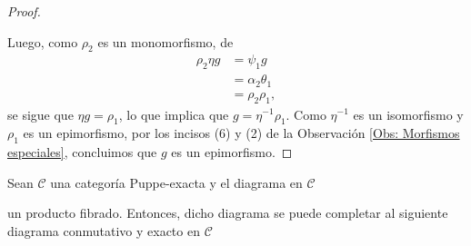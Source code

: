 \documentclass[tesis]{subfiles}
\begin{document}
\begin{proof}
\begin{center}
\begin{tikzcd}
        \end{tikzcd}
    \end{center}
    Luego, como $\rho_2$ es un monomorfismo, de
    \begin{align*}
        \rho_2\eta g &= \psi_1 g \\
                     &= \alpha_2\theta_1 \\
                     &= \rho_2\rho_1,
    \end{align*}
    se sigue que $\eta g=\rho_1$, lo que implica que $g = \eta^{-1}\rho_1$. Como $\eta^{-1}$ es un isomorfismo y $\rho_1$ es un epimorfismo, por los incisos (6) y (2) de la Observación \ref{Obs: Morfismos especiales}, concluimos que $g$ es un epimorfismo.
\end{proof}

\begin{Coro}\label{Mendoza-1.7.11}
    Sean $\mathscr{C}$ una categoría Puppe-exacta y el diagrama en $\mathscr{C}$
    \begin{center}
    \end{center}
    un producto fibrado. Entonces, dicho diagrama se puede completar al siguiente diagrama conmutativo y exacto en $\mathscr{C}$
    \begin{center}
    \end{center}
\end{Coro}
\end{document}
